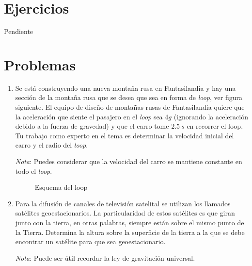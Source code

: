 \documentclass[letterpaper]{article}
\begin{document}
\section*{Ejercicios}

Pendiente

\section*{Problemas}

\begin{enumerate}

\item Se está construyendo una nueva montaña rusa en Fantasilandia y hay una sección de la montaña rusa que se desea que sea en forma de \emph{loop}, ver figura siguiente. El equipo de diseño de montañas rusas de Fantasilandia quiere que la aceleración que siente el pasajero en el \emph{loop} sea $4g$ (ignorando la aceleración debido a la fuerza de gravedad) y que el carro tome $2.5\ \si{s}$ en recorrer el loop. Tu trabajo como experto en el tema es determinar la velocidad inicial del carro y el radio del \emph{loop}.
 
\emph{Nota}: Puedes considerar que la velocidad del carro se mantiene constante en todo el \emph{loop}.

\begin{figure}[h]
\centering
{}
\caption{Esquema del loop}
\end{figure}

\item Para la difusión de canales de televisión satelital se utilizan los llamados satélites geoestacionarios. La particularidad de estos satélites es que giran junto con la tierra, en otras palabras, siempre están sobre el mismo punto de la Tierra. Determina la altura sobre la superficie de la tierra a la que se debe encontrar un satélite para que sea geoestacionario.

\emph{Nota}: Puede ser útil recordar la ley de gravitación universal.

\end{enumerate}
\end{document}

